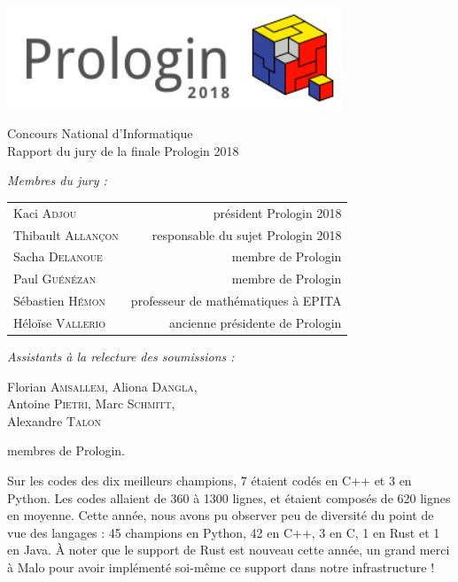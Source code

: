 \documentclass[a4paper,12pt,notitle,noheader,nofooter]{prologin}
\begin{document}
\begin{titlepage}
\begin{center}
\includegraphics[width=10cm]{../prologin2018}

\vspace{2.4cm}
{
 \Huge \textsf{Concours National d'Informatique}\\
 \vspace{1em}
 \Large Rapport du jury de la finale Prologin 2018
 \vspace{0.5cm}
}
\end{center}
\textit{Membres du jury :}
\begin{center}
\begin{tabular}{l r}
Kaci \textsc{Adjou} & président Prologin 2018 \\
Thibault \textsc{Allançon} & responsable du sujet Prologin 2018 \\
Sacha \textsc{Delanoue} & membre de Prologin \\
Paul \textsc{Guénézan} & membre de Prologin \\
Sébastien \textsc{Hémon} & professeur de mathématiques à EPITA \\
Héloïse \textsc{Vallerio} & ancienne présidente de Prologin
\end{tabular}
\end{center}
\textit{Assistants à la relecture des soumissions :}
\begin{center}
Florian \textsc{Amsallem}, Aliona \textsc{Dangla}, \\
Antoine \textsc{Pietri}, Marc \textsc{Schmitt}, \\
Alexandre \textsc{Talon}

\end{center}
\quad membres de Prologin.
\end{titlepage}


Sur les codes des dix meilleurs champions, 7 étaient codés en C++ et 3 en
Python. Les codes allaient de 360 à 1300 lignes, et étaient composés de 620
lignes en moyenne. Cette année, nous avons pu observer peu de diversité du point
de vue des langages : 45 champions en Python, 42 en C++, 3 en C, 1 en Rust et 1
en Java. À noter que le support de Rust est nouveau cette année, un grand merci
à Malo pour avoir implémenté soi-même ce support dans notre infrastructure !
\end{document}

